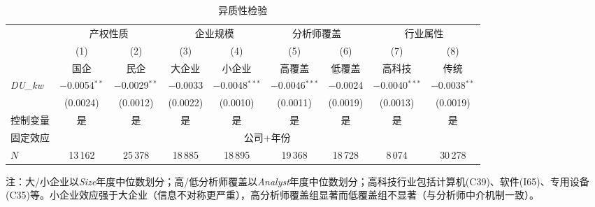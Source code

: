 \documentclass[11pt,a4paper]{article}
\begin{document}
\begin{table}[htbp]
\centering
\caption{异质性检验}
\label{tab:hetero}
\footnotesize
\setlength{\tabcolsep}{3.5pt}
\begin{tabular}{l*{8}{c}}
\toprule
 & \multicolumn{2}{c}{产权性质} & \multicolumn{2}{c}{企业规模} & \multicolumn{2}{c}{分析师覆盖} & \multicolumn{2}{c}{行业属性} \\
\cmidrule(lr){2-3}\cmidrule(lr){4-5}\cmidrule(lr){6-7}\cmidrule(lr){8-9}
 & (1) & (2) & (3) & (4) & (5) & (6) & (7) & (8) \\
 & 国企 & 民企 & 大企业 & 小企业 & 高覆盖 & 低覆盖 & 高科技 & 传统 \\
\midrule
\textit{DU\_kw}
 & $-$0.0054$^{**}$ & $-$0.0029$^{**}$ & $-$0.0033 & $-$0.0048$^{***}$ & $-$0.0046$^{***}$ & $-$0.0024 & $-$0.0040$^{***}$ & $-$0.0038$^{**}$ \\
 & (0.0024) & (0.0012) & (0.0022) & (0.0010) & (0.0011) & (0.0019) & (0.0013) & (0.0019) \\[6pt]
\midrule
控制变量 & 是 & 是 & 是 & 是 & 是 & 是 & 是 & 是 \\
固定效应 & \multicolumn{8}{c}{公司+年份} \\
$N$ & 13\,162 & 25\,378 & 18\,885 & 18\,895 & 19\,368 & 18\,728 & 8\,074 & 30\,278 \\
\bottomrule
\end{tabular}

\vspace{4pt}
{\footnotesize 注：大/小企业以\textit{Size}年度中位数划分；高/低分析师覆盖以\textit{Analyst}年度中位数划分；高科技行业包括计算机(C39)、软件(I65)、专用设备(C35)等。小企业效应强于大企业（信息不对称更严重），高分析师覆盖组显著而低覆盖组不显著（与分析师中介机制一致）。}
\end{table}


\FloatBarrier
\end{document}
